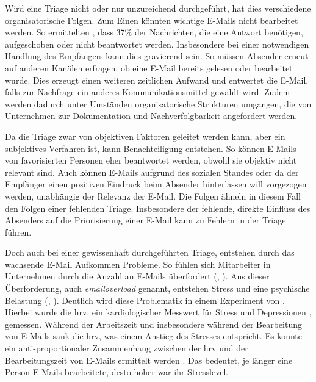 Wird eine Triage nicht oder nur unzureichend durchgeführt, hat dies verschiedene organisatorische Folgen. Zum Einen könnten wichtige E-Mails nicht bearbeitet werden. So ermittelten \cite{Dabbish2006}, dass 37\% der Nachrichten, die eine Antwort benötigen, aufgeschoben oder nicht beantwortet werden. Insbesondere bei einer notwendigen Handlung des Empfängers kann dies gravierend sein. So müssen Absender erneut auf anderen Kanälen erfragen, ob eine E-Mail bereits gelesen oder bearbeitet wurde. Dies erzeugt einen weiteren zeitlichen Aufwand und entwertet die E-Mail, falls zur Nachfrage ein anderes Kommunikationsmittel gewählt wird. Zudem werden dadurch unter Umständen organisatorische Strukturen umgangen, die von Unternehmen zur Dokumentation und Nachverfolgbarkeit angefordert werden.

Da die Triage zwar von objektiven Faktoren geleitet werden kann, aber ein subjektives Verfahren ist, kann Benachteiligung entstehen. So können E-Mails von favorisierten Personen eher beantwortet werden, obwohl sie objektiv nicht relevant sind. Auch können E-Mails aufgrund des sozialen Standes oder da der Empfänger einen positiven Eindruck beim Absender hinterlassen will vorgezogen werden, unabhängig der Relevanz der E-Mail. Die Folgen ähneln in diesem Fall den Folgen einer fehlenden Triage. Insbesondere der fehlende, direkte Einfluss des Absenders auf die Priorisierung einer E-Mail kann zu Fehlern in der Triage führen.

Doch auch bei einer gewissenhaft durchgeführten Triage, entstehen durch das wachsende E-Mail Aufkommen Probleme. So fühlen sich Mitarbeiter in Unternehmen durch die Anzahl an E-Mails überfordert (\cite[S. 179]{Dawley2003}, \cite[S. 264 f.]{Thomas2006}). Aus dieser Überforderung, auch \textit{\gls{emailoverload}} genannt, entstehen Stress und eine psychische Belastung (\cite[S. 117]{Lagrana2016}, \cite[S. 331]{Eppler2004}). Deutlich wird diese Problematik in einem Experiment von \cite{Mark2016}. Hierbei wurde die \acrfull{hrv}, ein kardiologischer Messwert für Stress und Depressionen \citep[S. 881]{Vrijkotte2000}, gemessen. Während der Arbeitszeit und insbesondere während der Bearbeitung von E-Mails sank die \acrshort{hrv}, was einem Anstieg des Stresses entspricht. Es konnte ein anti-proportionaler Zusammenhang zwischen der \acrshort{hrv} und der Bearbeitungszeit von E-Mails ermittelt werden \citep[S. 1724]{Mark2016}. Das bedeutet, je länger eine Person E-Mails bearbeitete, desto höher war ihr Stresslevel. 



